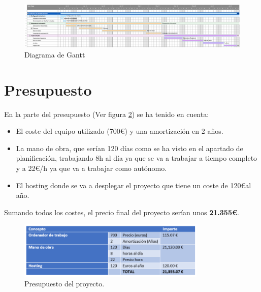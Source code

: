 \begin{figure}[htb]
    \centering
    \includegraphics[width=\textwidth]{imagenes/Diagrama_Gann.png}
\caption{Diagrama de Gantt}
\label{fig:Gantt}
\end{figure}

\section{Presupuesto}

En la parte del presupuesto (Ver figura \ref{fig:Presupuesto}) se ha tenido en cuenta:
\begin{itemize}
    \item El coste del equipo utilizado (700\euro) y una amortización en 2 años.
    \item La mano de obra, que serían 120 días como se ha visto en el apartado de planificación, trabajando 8h al día ya que se va a trabajar a tiempo completo y a 22\euro/h ya que va a trabajar como autónomo.
    \item El hosting donde se va a desplegar el proyecto que tiene un coste de 120\euro al año.
\end{itemize}

Sumando todos los costes, el precio final del proyecto serían unos \textbf{21.355\euro}.

\begin{figure}[htb]
    \centering
    \includegraphics[width=0.8\textwidth]{imagenes/Presupuesto.png}
\caption{Presupuesto del proyecto.}
\label{fig:Presupuesto}
\end{figure}